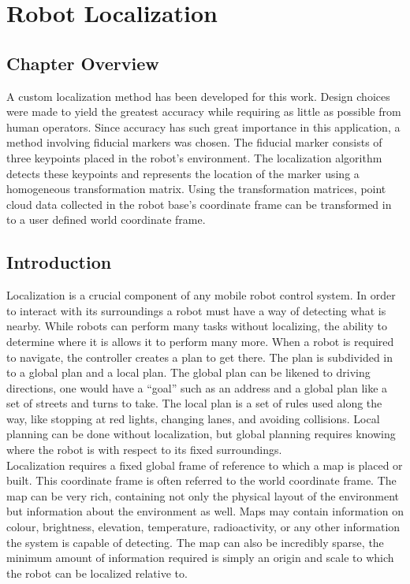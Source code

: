 \chapter{Robot Localization}
\label{chap:localiz}
\section{Chapter Overview}
A custom localization method has been developed for this work. Design choices were made to yield the greatest accuracy while requiring as little as possible from human operators. Since accuracy has such great importance in this application, a method involving fiducial markers was chosen. The fiducial marker consists of three keypoints placed in the robot's environment. The localization algorithm detects these keypoints and represents the location of the marker using a homogeneous transformation matrix. Using the transformation matrices, point cloud data collected in the robot base's coordinate frame can be transformed in to a user defined world coordinate frame.\\

\section{Introduction}
Localization is a crucial component of any mobile robot control system. In order to interact with its surroundings a robot must have a way of detecting what is nearby. While robots can perform many tasks without localizing, the ability to determine where it is allows it to perform many more. When a robot is required to navigate, the controller creates a plan to get there. The plan is subdivided in to a global plan and a local plan. The global plan can be likened to driving directions, one would have a ``goal'' such as an address and a global plan like a set of streets and turns to take. The local plan is a set of rules used along the way, like stopping at red lights, changing lanes, and avoiding collisions. Local planning can be done without localization, but global planning requires knowing where the robot is with respect to its fixed surroundings.\\

Localization requires a fixed global frame of reference to which a map is placed or built. This coordinate frame is often referred to the world coordinate frame. The map can be very rich, containing not only the physical layout of the environment but information about the environment as well. Maps may contain information on colour, brightness, elevation, temperature, radioactivity, or any other information the system is capable of detecting. The map can also be incredibly sparse, the minimum amount of information required is simply an origin and scale to which the robot can be localized relative to.\\

